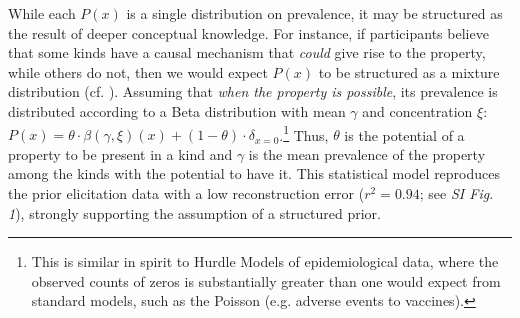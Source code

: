 \documentclass{pnastwo}
\begin{document}
\begin{article}
While each $P(x)$ is a single distribution on prevalence, it may be structured as the result of deeper conceptual knowledge. 
For instance, if participants believe that some kinds have a causal mechanism that \emph{could} give rise to the property, while others do not, then we would expect $P(x)$ to be structured as a mixture distribution (cf. \cite{Griffiths2005}).
Assuming that \emph{when the property is possible}, its prevalence is distributed according to a Beta distribution with mean $\gamma$ and concentration $\xi$: 
$P(x)=\theta \cdot \beta(\gamma,\xi)(x) + (1-\theta) \cdot \delta_{x=0}$.\footnote{This is similar in spirit to Hurdle Models of epidemiological data, where the observed counts of zeros is substantially greater than one would expect from standard models, such as the Poisson (e.g. adverse events to vaccines)\cite{hurdleModels}.}
Thus, $\theta$ is the potential of a property to be present in a kind and $\gamma$ is the mean prevalence of the property among the kinds with the potential to have it. %
This statistical model reproduces the prior elicitation data with a low reconstruction error ($r^2 = 0.94$; see {\it SI Fig. 1}), strongly supporting the assumption of a structured prior. 



\end{article}
\end{document}
